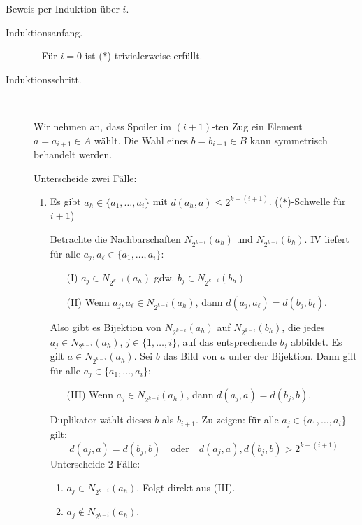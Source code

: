 \documentclass[fontsize=11pt, twoside=false, numbers=autoenddot]{scrbook}
\begin{document}
\begin{beweis}
  Beweis per Induktion \"uber $i$.
  \begin{description}
    \item[Induktionsanfang.]~
      F\"ur $i=0$ ist ($*$) trivialerweise erf\"ullt.
      \goodbreak
    \item[Induktionsschritt.]~
      \par
      Wir nehmen an, dass Spoiler im $(i+1)$-ten Zug ein Element $a=a_{i+1} \in A$
      w\"ahlt. Die Wahl eines $b=b_{i+1} \in B$ kann symmetrisch behandelt werden.

      \par\smallskip\noindent
      Unterscheide zwei F\"alle:
      \begin{enumerate}
        \item
          Es gibt $a_h \in \{a_1,\dots,a_i\}$ mit $d(a_h,a) \leq 2^{k-(i+1)}$. (($*$)-Schwelle f\"ur $i+1$)

          Betrachte die Nachbarschaften $N_{2^{k-i}}(a_h)$ und
          $N_{2^{k-i}}(b_h)$. 
          IV liefert 
          f\"ur alle $a_j,a_\ell \in \{ a_1,\dots,a_i \}$:
          \begin{enumerate}
            \item[(I)]
              $a_j \in N_{2^{k-i}}(a_h)$ gdw.  $b_j \in N_{2^{k-i}}(b_h)$
            \item[(II)]
              Wenn $a_j,a_\ell \in N_{2^{k-i}}(a_h)$, dann $d(a_j,a_\ell)=d(b_j,b_\ell)$.
          \end{enumerate}
          Also gibt es Bijektion von $N_{2^{k-i}}(a_h)$ auf
          $N_{2^{k-i}}(b_h)$, die jedes $a_j \in N_{2^{k-i}}(a_h)$, $j \in
          \{1,\dots,i\}$, auf das entsprechende $b_j$ abbildet. Es gilt $a \in
          N_{2^{k-i}}(a_h)$.  Sei $b$ das Bild von $a$ unter der
          Bijektion. Dann gilt f\"ur alle $a_j \in \{a_1,\dots,a_i\}$:
          \begin{enumerate}
            \item[(III)]
              Wenn $a_j \in N_{2^{k-i}}(a_h)$, dann $d(a_j,a)=d(b_j,b)$.
          \end{enumerate}
          Duplikator w\"ahlt dieses $b$ als $b_{i+1}$. Zu zeigen: f\"ur alle $a_j \in \{a_1,\dots, a_i\}$ gilt: 
          \[
            d(a_j,a)=d(b_j,b)
            \quad\text{oder}\quad
            d(a_j,a),d(b_j,b) > 2^{k-(i+1)}
          \]
          Unterscheide 2 F\"alle:
          \begin{enumerate}
            \item
              $a_j \in N_{2^{k-i}}(a_h)$. Folgt direkt aus (III).
          \item
            $a_j \notin N_{2^{k-i}}(a_h)$.


\end{enumerate}
\end{enumerate}
\end{description}
\end{beweis}
\end{document}
